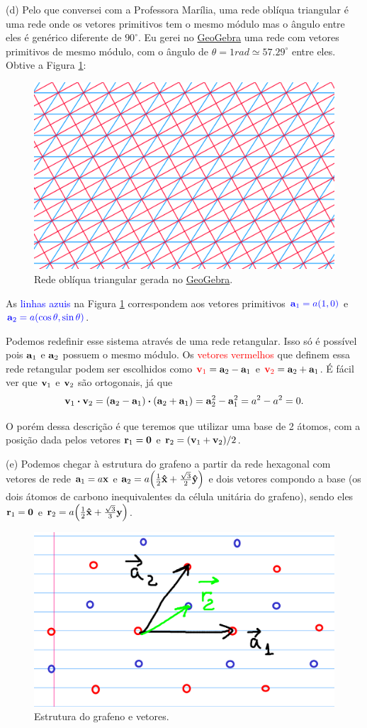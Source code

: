 \documentclass[a4paper,10pt]{article}
\begin{document}
\pagebreak

(d) Pelo que conversei com a Professora Marília, uma rede oblíqua triangular é uma rede onde os vetores primitivos tem o mesmo módulo mas o ângulo entre eles é genérico diferente de $90^\circ$. Eu gerei no \href{https://www.geogebra.org/geometry}{GeoGebra} uma rede com vetores primitivos de mesmo módulo, com o ângulo de $\theta = 1 \unit{rad} \simeq 57.29^\circ$ entre eles. Obtive a Figura \ref{fig:obliq_triang}:
\begin{figure}[H]
\centering
\includegraphics[width=0.7\linewidth]{fig/obliq_triang.png}
\caption{Rede oblíqua triangular gerada no \href{https://www.geogebra.org/geometry}{GeoGebra}.}
\label{fig:obliq_triang}
\end{figure}

As \textcolor{blue}{linhas azuis} na Figura \ref{fig:obliq_triang} correspondem aos vetores primitivos $\textcolor{blue}{\vb{a}_1 = a(1,0)}$ e $\textcolor{blue}{\vb{a}_2 = a(\cos\theta,\sin\theta)}$.

Podemos redefinir esse sistema através de uma rede retangular. Isso só é possível pois $\vb{a}_1$ e $\vb{a}_2$ possuem o mesmo módulo. Os \textcolor{red}{vetores vermelhos} que definem essa rede retangular podem ser escolhidos como $\textcolor{red}{\vb{v}_1} = \vb{a}_2 - \vb{a}_1$ e $\textcolor{red}{\vb{v}_2} = \vb{a}_2 + \vb{a}_1$. É fácil ver que $\vb{v}_1$ e $\vb{v}_2$ são ortogonais, já que
$$
\v_1 \vdot \v_2 = (\a_2 - \a_1) \vdot (\a_2 + \a_1) = \a_2^2 - \a_1^2 = a^2 - a^2 = 0.
$$

O porém dessa descrição é que teremos que utilizar uma base de 2 átomos, com a posição dada pelos vetores $\vb{r}_1 = \vb{0}$ e $\vb{r}_2 = (\vb{v}_1 + \vb{v}_2)/2$.

\n

(e) Podemos chegar à estrutura do grafeno a partir da rede hexagonal com vetores de rede $\vb{a}_1 = a \vb{x}$ e $\vb{a}_2 = a \qty(\frac{1}{2} \vu{x} + \frac{\sqrt{3}}{2} \vu{y})$ e dois vetores compondo a base (os dois átomos de carbono inequivalentes da célula unitária do grafeno), sendo eles $\vb{r}_1 = \vb{0}$ e $\vb{r}_2 = a \qty(\frac{1}{2}\vu{x} + \frac{\sqrt{3}}{3}\vb{y})$.
\begin{figure}[H]
\centering
\includegraphics[width=0.4\linewidth]{fig/graphene_vec}
\caption{Estrutura do grafeno e vetores.}
\label{fig:graphene_vec}
\end{figure}
\end{document}
